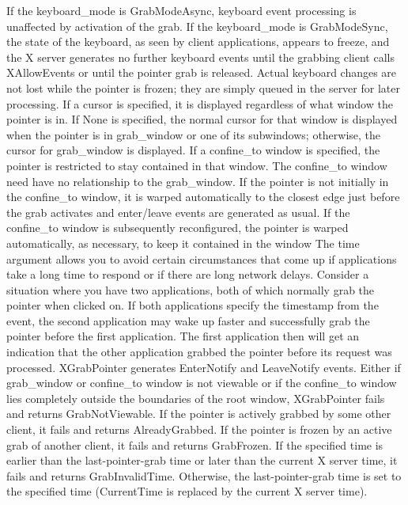 \documentclass{report}
\begin{document}
\begin{itemize}
            \bigbreak \noindent 
            If the keyboard\_mode is GrabModeAsync, keyboard event processing is unaffected by activation of the grab. If the keyboard\_mode is GrabModeSync, the state of the keyboard, as seen by client applications, appears to freeze, and the X server generates no further keyboard events until the grabbing client calls XAllowEvents or until the pointer grab is released. Actual keyboard changes are not lost while the pointer is frozen; they are simply queued in the server for later processing.
            \bigbreak \noindent 
            If a cursor is specified, it is displayed regardless of what window the pointer is in. If None is specified, the normal cursor for that window is displayed when the pointer is in grab\_window or one of its subwindows; otherwise, the cursor for grab\_window is displayed.
            \bigbreak \noindent 
            If a confine\_to window is specified, the pointer is restricted to stay contained in that window. The confine\_to window need have no relationship to the grab\_window. If the pointer is not initially in the confine\_to window, it is warped automatically to the closest edge just before the grab activates and enter/leave events are generated as usual. If the confine\_to window is subsequently reconfigured, the pointer is warped automatically, as necessary, to keep it contained in the window
            \bigbreak \noindent 
            The time argument allows you to avoid certain circumstances that come up if applications take a long time to respond or if there are long network delays. Consider a situation where you have two applications, both of which normally grab the pointer when clicked on. If both applications specify the timestamp from the event, the second application may wake up faster and successfully grab the pointer before the first application. The first application then will get an indication that the other application grabbed the pointer before its request was processed.
            \bigbreak \noindent 
            XGrabPointer generates EnterNotify and LeaveNotify events.
            \bigbreak \noindent 
            Either if grab\_window or confine\_to window is not viewable or if the confine\_to window lies completely outside the boundaries of the root window, XGrabPointer fails and returns GrabNotViewable. If the pointer is actively grabbed by some other client, it fails and returns AlreadyGrabbed. If the pointer is frozen by an active grab of another client, it fails and returns GrabFrozen. If the specified time is earlier than the last-pointer-grab time or later than the current X server time, it fails and returns GrabInvalidTime. Otherwise, the last-pointer-grab time is set to the specified time (CurrentTime is replaced by the current X server time).

\end{itemize}
\end{document}
